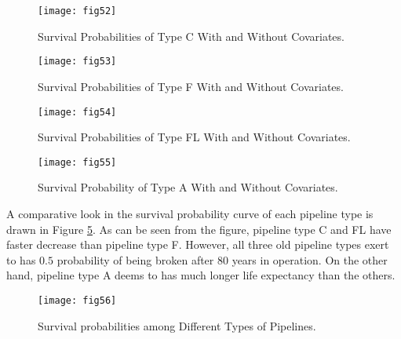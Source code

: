 \begin{figure}[t]
\begin{center}
\texttt{[image: fig52]} 
\end{center}
\caption{Survival Probabilities of Type C With and Without Covariates.}
\label{fig52} 
\end{figure}
%
\begin{figure}[t]
\begin{center}
\texttt{[image: fig53]} 
\end{center}
\caption{Survival Probabilities of Type F With and Without Covariates.}
\label{fig53} 
\end{figure}
%
\begin{figure}[t]
\begin{center}
\texttt{[image: fig54]} 
\end{center}
\caption{Survival Probabilities of Type FL With and Without Covariates.}
\label{fig54} 
\end{figure}
%
\begin{figure}[t]
\begin{center}
\texttt{[image: fig55]} 
\end{center}
\caption{Survival Probability of Type A With and Without Covariates.}
\label{fig55} 
\end{figure}
A comparative look in the survival probability curve of each pipeline type is drawn in Figure \ref{fig56}. As can be seen from the figure, pipeline type C and FL have faster decrease than pipeline type F. However, all three old pipeline types exert to has $0.5$ probability of being broken after 80 years in operation. On the other hand, pipeline type A deems to has much longer life expectancy than the others.
\begin{figure}[t]
\begin{center}
\texttt{[image: fig56]} 
\end{center}
\caption{Survival probabilities among Different Types of Pipelines.}
\label{fig56} 
\end{figure}
%
